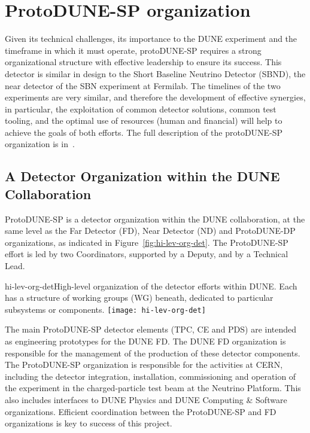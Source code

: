 
\section{ProtoDUNE-SP organization}

Given its technical challenges, its importance to the DUNE experiment and the timeframe in which it must operate, protoDUNE-SP requires a strong organizational structure with effective leadership to ensure its success. This detector is similar in design to the Short Baseline Neutrino Detector (SBND), the near detector of the SBN experiment at Fermilab. The timelines of the two experiments are very similar, and therefore the development of effective synergies, in particular, the exploitation of common detector solutions, common test tooling, and the optimal use of resources (human and financial) will help to achieve the goals of both efforts.  The full description of the protoDUNE-SP organization is in~\cite{pdune-sp-org}.

\subsection{A Detector Organization within the DUNE Collaboration}

ProtoDUNE-SP is a detector organization within the DUNE collaboration, at the same level as the Far Detector (FD), Near Detector (ND) and ProtoDUNE-DP organizations, as indicated in Figure~\ref{fig:hi-lev-org-det}. The ProtoDUNE-SP effort is led by two Coordinators, supported by a Deputy, and by a Technical Lead.

\begin{cdrfigure}{hi-lev-org-det}{High-level organization of the detector efforts within DUNE. Each has a structure of working groups (WG) beneath, dedicated to particular subsystems or components.}
 \texttt{[image: hi-lev-org-det]}
\end{cdrfigure}

The main ProtoDUNE-SP detector elements (TPC, CE and PDS) are intended as engineering prototypes for the DUNE FD. The DUNE FD organization is responsible for the management of the production of these detector components. The ProtoDUNE-SP organization is responsible for the activities at CERN, including the detector integration, installation, commissioning and operation of the experiment in the charged-particle test beam at the Neutrino Platform.  This also includes interfaces to DUNE Physics and DUNE Computing \& Software organizations. Efficient coordination between the ProtoDUNE-SP and FD organizations is key to success of this project.



